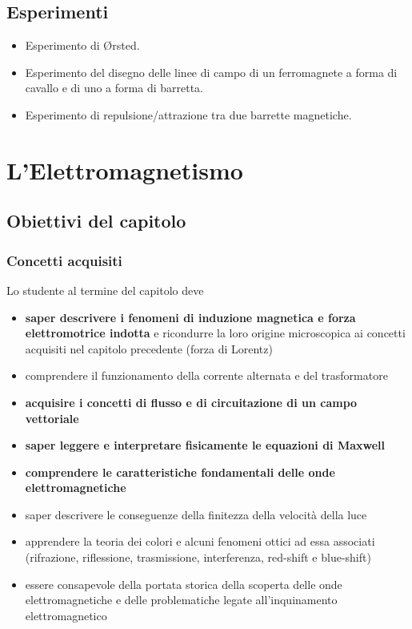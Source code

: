 \documentclass[11pt]{report}
\begin{document}
\section*{Esperimenti}
\begin{itemize}
    \item Esperimento di \O rsted.
    \item Esperimento del disegno delle linee di campo di un ferromagnete a forma di cavallo e di uno a forma di barretta.
    \item Esperimento di repulsione/attrazione tra due barrette magnetiche.
\end{itemize}

\chapter{L'Elettromagnetismo}

\section*{Obiettivi del capitolo}

\subsection*{Concetti acquisiti}
Lo studente al termine del capitolo deve
\begin{itemize}
    \item \textbf{saper descrivere i fenomeni di induzione magnetica e forza elettromotrice indotta} e ricondurre la loro origine microscopica ai concetti acquisiti nel capitolo precedente (forza di Lorentz)
    \item comprendere il funzionamento della corrente alternata e del trasformatore
    \item \textbf{acquisire i concetti di flusso e di circuitazione di un campo vettoriale}
    \item \textbf{saper leggere e interpretare fisicamente le equazioni di Maxwell}
    \item \textbf{comprendere le caratteristiche fondamentali delle onde elettromagnetiche}
    \item saper descrivere le conseguenze della finitezza della velocità della luce
    \item apprendere la teoria dei colori e alcuni fenomeni ottici ad essa associati (rifrazione, riflessione, trasmissione, interferenza, red-shift e blue-shift)
    \item essere consapevole della portata storica della scoperta delle onde elettromagnetiche e delle problematiche legate all'inquinamento elettromagnetico
\end{itemize}
\end{document}
